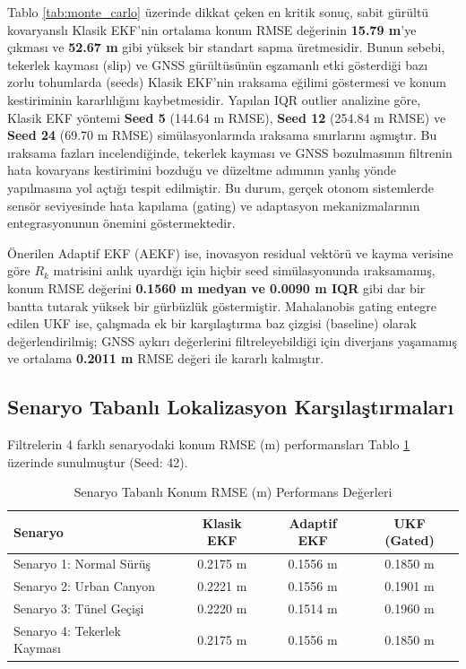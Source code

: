 ﻿\documentclass[conference]{IEEEtran}
\begin{document}
Tablo \ref{tab:monte_carlo} üzerinde dikkat çeken en kritik sonuç, sabit gürültü kovaryanslı Klasik EKF'nin ortalama konum RMSE değerinin \textbf{15.79 m}'ye çıkması ve \textbf{52.67 m} gibi yüksek bir standart sapma üretmesidir. Bunun sebebi, tekerlek kayması (slip) ve GNSS gürültüsünün eşzamanlı etki gösterdiği bazı zorlu tohumlarda (seeds) Klasik EKF'nin ıraksama eğilimi göstermesi ve konum kestiriminin kararlılığını kaybetmesidir. Yapılan IQR outlier analizine göre, Klasik EKF yöntemi \textbf{Seed 5} (144.64 m RMSE), \textbf{Seed 12} (254.84 m RMSE) ve \textbf{Seed 24} (69.70 m RMSE) simülasyonlarında ıraksama sınırlarını aşmıştır. Bu ıraksama fazları incelendiğinde, tekerlek kayması ve GNSS bozulmasının filtrenin hata kovaryans kestirimini bozduğu ve düzeltme adımının yanlış yönde yapılmasına yol açtığı tespit edilmiştir. Bu durum, gerçek otonom sistemlerde sensör seviyesinde hata kapılama (gating) ve adaptasyon mekanizmalarının entegrasyonunun önemini göstermektedir.

Önerilen Adaptif EKF (AEKF) ise, inovasyon residual vektörü ve kayma verisine göre $R_k$ matrisini anlık uyardığı için hiçbir seed simülasyonunda ıraksamamış, konum RMSE değerini \textbf{0.1560 m medyan ve 0.0090 m IQR} gibi dar bir bantta tutarak yüksek bir gürbüzlük göstermiştir. Mahalanobis gating entegre edilen UKF ise, çalışmada ek bir karşılaştırma baz çizgisi (baseline) olarak değerlendirilmiş; GNSS aykırı değerlerini filtreleyebildiği için diverjans yaşamamış ve ortalama \textbf{0.2011 m} RMSE değeri ile kararlı kalmıştır.


\subsection{Senaryo Tabanlı Lokalizasyon Karşılaştırmaları}
Filtrelerin 4 farklı senaryodaki konum RMSE (m) performansları Tablo \ref{tab:scenarios} üzerinde sunulmuştur (Seed: 42).

\begin{table}[htbp]
\caption{Senaryo Tabanlı Konum RMSE (m) Performans Değerleri}
\label{tab:scenarios}
\centering
\footnotesize
\begin{tabular}{lccc}
\toprule
\textbf{Senaryo} & \textbf{Klasik EKF} & \textbf{Adaptif EKF} & \textbf{UKF (Gated)} \\
\midrule
Senaryo 1: Normal Sürüş & 0.2175 m & 0.1556 m & 0.1850 m \\
Senaryo 2: Urban Canyon & 0.2221 m & 0.1556 m & 0.1901 m \\
Senaryo 3: Tünel Geçişi & 0.2220 m & 0.1514 m & 0.1960 m \\
Senaryo 4: Tekerlek Kayması & 0.2175 m & 0.1556 m & 0.1850 m \\
\bottomrule
\end{tabular}
\end{table}
\end{document}
